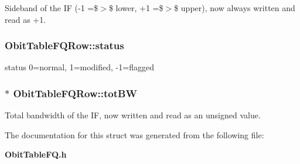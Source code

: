Sideband of the IF (-1 =\$$>$\$ lower, +1 =\$$>$\$ upper), now always written and read as +1. 

\subsubsection{ {\bf Obit\-Table\-FQRow::status}}\label{structObitTableFQRow_o11}


status 0=normal, 1=modified, -1=flagged 

\subsubsection{$\ast$ {\bf Obit\-Table\-FQRow::tot\-BW}}\label{structObitTableFQRow_o9}


Total bandwidth of the IF, now written and read as an unsigned value. 



The documentation for this struct was generated from the following file:\begin{CompactItemize}
\item 
{\bf Obit\-Table\-FQ.h}\end{CompactItemize}

